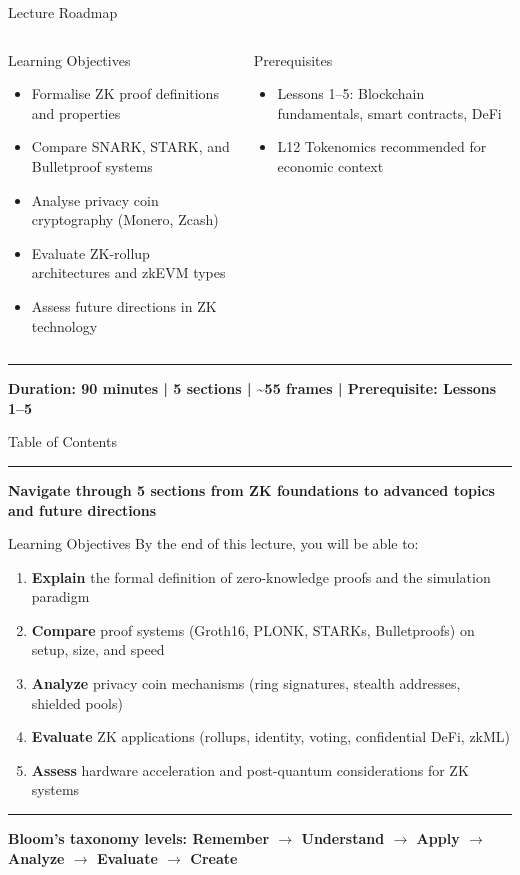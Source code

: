 \documentclass[8pt,aspectratio=169]{beamer}
\newcommand{\bottomnote}[1]{\vfill\vspace{-2mm}\textcolor{mllavender2}{\rule{\textwidth}{0.4pt}}\vspace{1mm}\footnotesize\textbf{#1}}
\begin{document}
\begin{frame}{Lecture Roadmap}
\begin{columns}[T]
\begin{block}{Learning Objectives}
\footnotesize
\begin{itemize}
  \item Formalise ZK proof definitions and properties
  \item Compare SNARK, STARK, and Bulletproof systems
  \item Analyse privacy coin cryptography (Monero, Zcash)
  \item Evaluate ZK-rollup architectures and zkEVM types
  \item Assess future directions in ZK technology
\end{itemize}
\end{block}
\vspace{1mm}
\begin{block}{Prerequisites}
\footnotesize
\begin{itemize}
  \item Lessons 1--5: Blockchain fundamentals, smart contracts, DeFi
  \item L12 Tokenomics recommended for economic context
\end{itemize}
\end{block}
\end{columns}
\bottomnote{Duration: 90 minutes | 5 sections | \textasciitilde55 frames | Prerequisite: Lessons 1--5}
\end{frame}

\begin{frame}{Table of Contents}
\tableofcontents
\bottomnote{Navigate through 5 sections from ZK foundations to advanced topics and future directions}
\end{frame}

\begin{frame}{Learning Objectives}
By the end of this lecture, you will be able to:
\begin{enumerate}
\item \textbf{Explain} the formal definition of zero-knowledge proofs and the simulation paradigm
\item \textbf{Compare} proof systems (Groth16, PLONK, STARKs, Bulletproofs) on setup, size, and speed
\item \textbf{Analyze} privacy coin mechanisms (ring signatures, stealth addresses, shielded pools)
\item \textbf{Evaluate} ZK applications (rollups, identity, voting, confidential DeFi, zkML)
\item \textbf{Assess} hardware acceleration and post-quantum considerations for ZK systems
\end{enumerate}
\bottomnote{Bloom's taxonomy levels: Remember $\rightarrow$ Understand $\rightarrow$ Apply $\rightarrow$ Analyze $\rightarrow$ Evaluate $\rightarrow$ Create}
\end{frame}
\end{document}

